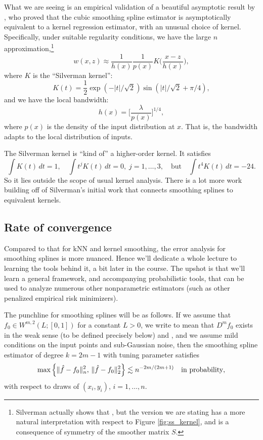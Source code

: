 \documentclass{article}
\begin{document}
What we are seeing is an empirical validation of a beautiful asymptotic result
by \citet{silverman1984spline}, who proved that the cubic smoothing spline
estimator is asymptotically equivalent to a kernel regression estimator, with an 
unusual choice of kernel. Specifically, under suitable regularity conditions, we
have the large $n$ approximation,\footnote{Silverman actually shows that
  ,
  but the version we are stating has a more natural interpretation with respect
  to Figure \ref{fig:ss_kernel}, and is a consequence of symmetry of the
  smoother matrix $S$.}  
\[
w(x, z) \approx \frac{1}{h(x)} \frac{1}{p(x)} K\bigg( \frac{x-z}{h(x)} \bigg), 
\]
where $K$ is the ``Silverman kernel'': 
\[
K(t) = \frac{1}{2} \exp(-|t|/\sqrt{2}) \sin(|t|/\sqrt{2} + \pi/4), 
\]
and we have the local bandwidth: 
\[
h(x) = \bigg[ \frac{\lambda}{p(x)} \bigg]^{1/4},
\]
where $p(x)$ is the density of the input distribution at $x$. That is, the
bandwidth adapts to the local distribution of inputs. 

The Silverman kernel is ``kind of'' a higher-order kernel. It satisfies 
\[
\int K(t) \, dt = 1, \quad
\int t^j K(t) \, dt = 0, \; j=1,\dots,3, 
\quad \text{but} \quad 
\int t^4 K(t) \, dt = -24.
\]
So it lies outside the scope of usual kernel analysis. There is a lot more work
building off of Silverman's initial work that connects smoothing splines to
equivalent kernels. 

\subsection{Rate of convergence} 

Compared to that for kNN and kernel smoothing, the error analysis for smoothing
splines is more nuanced. Hence we'll dedicate a whole lecture to learning the
tools behind it, a bit later in the course. The upshot is that we'll learn a
general framework, and accompanying probabilistic tools, that can be used 
to analyze numerous other nonparametric estimators (such as other penalized 
empirical risk minimizers).        

The punchline for smoothing splines will be as follows. If we assume that $f_0
\in W^{m,2}(L; [0,1])$ for a constant $L>0$, we write to mean that $D^m f_0$
exists in the weak sense (to be defined precisely below) and , and we assume mild conditions on the input 
points and sub-Gaussian noise, then the smoothing spline estimator of degree
$k=2m-1$ with tuning parameter  satisfies    
\[
\max \Big\{ \|\hat{f} - f_0\|_n^2 , \, \|\hat{f} - f_0\|_2^2 \Big\} \lesssim
n^{-2m/(2m+1)} \quad \text{in probability},
\]
with respect to draws of $(x_i,y_i)$, $i=1,\dots,n$.
\end{document}
